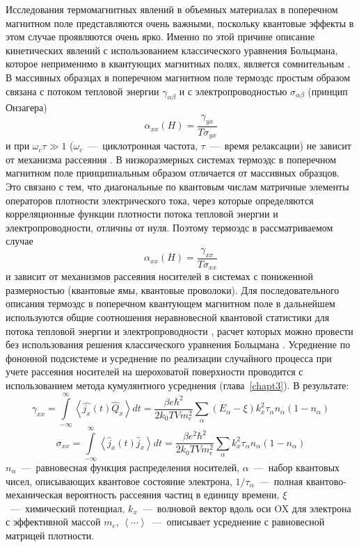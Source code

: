 Исследования термомагнитных явлений в объемных материалах в поперечном магнитном поле представляются очень важными, поскольку квантовые эффекты в этом случае проявляются очень ярко. Именно по этой причине описание кинетических явлений с использованием классического уравнения Больцмана, которое неприменимо в квантующих магнитных полях, является сомнительным \cite{Askerov1970}. В массивных образцах в поперечном магнитном поле термоэдс простым образом связана с потоком тепловой энергии $\gamma_{\alpha\beta}$ и с электропроводностью $\sigma_{\alpha\beta}$ (принцип Онзагера)
\[
\alpha_{xx}(H) = \frac{\gamma_{yx}}{T \sigma_{yx}}
\] 
и при $\omega_c \tau \gg 1$ ($\omega_c$~---~циклотронная частота, $\tau$~---~время релаксации) не зависит от механизма рассеяния \cite{Askerov1970}. В низкоразмерных системах термоэдс в поперечном магнитном поле принципиальным образом отличается от массивных образцов. Это связано с тем, что диагональные по квантовым числам матричные элементы операторов плотности электрического тока, через которые определяются корреляционные функции плотности потока тепловой энергии и электропроводности, отличны от нуля. Поэтому термоэдс в рассматриваемом случае
\begin{equation} \label{eq:44_05} 
\alpha_{xx}(H) = \frac{\gamma_{xx}}{T \sigma_{xx}}
\end{equation}
и зависит от механизмов рассеяния носителей в системах с пониженной размерностью (квантовые ямы, квантовые проволоки). Для последовательного описания термоэдс в поперечном квантующем магнитном поле в дальнейшем используются общие соотношения неравновесной квантовой статистики для потока тепловой энергии и электропроводности \cite{Kubo1957}, расчет которых можно провести без использования решения классического уравнения Больцмана \cite{Khamidullin2002}. Усреднение по фононной подсистеме и усреднение по реализации случайного процесса при учете рассеяния носителей на шероховатой поверхности проводится с использованием метода кумулянтного усреднения (глава~\ref{chapt3}). В результате:  
\begin{equation} \label{eq:44_07} 
\gamma_{xx} = \int\limits_{- \infty }^{\infty}{\left\langle \hat{j_x}(t) \hat{Q}_x \right\rangle  dt} =
\frac{\beta e \hbar^2 }{2 k_0 TV m_e^2} \sum_{\alpha}{\left( E_{\alpha} - \xi \right) k_x^2 \tau_{\alpha} n_{\alpha}\left( 1 - n_{\alpha} \right) }
\end{equation}
\begin{equation} \label{eq:44_08} 
\sigma_{xx} = \int\limits_{- \infty }^{\infty}{\left\langle \hat{j}_x(t) \hat{j}_x \right\rangle  dt} =
\frac{\beta e^2 \hbar^2 }{2 k_0 T V m_e^2} \sum_{\alpha}{k_x^2 \tau_{\alpha} n_{\alpha}\left( 1 - n_{\alpha} \right) }
\end{equation}
$n_{\alpha}$~---~равновесная функция распределения носителей, $\alpha$~---~набор квантовых чисел, описывающих квантовое состояние электрона, $1/\tau_{\alpha}$~---~полная квантово-механическая вероятность рассеяния частиц в единицу времени, $\xi$~---~химический потенциал, $k_x$~---~волновой вектор вдоль оси OX для электрона с эффективной массой $m_e$, $\left\langle \cdots \right\rangle$~---~описывает усреднение с равновесной матрицей плотности.


